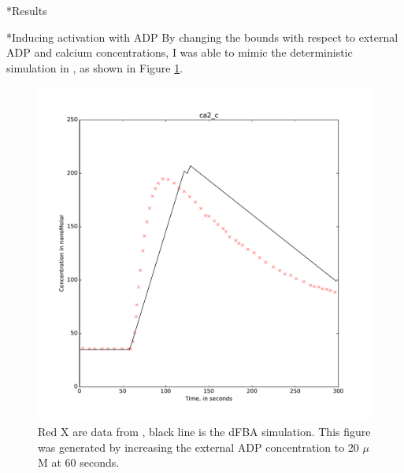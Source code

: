 \documentclass[11pt]{article}
\makeatletter
\renewcommand\subsection{\@startsection
	{subsection}{2}{0mm}
	{-0.05in}
	{-0.5\baselineskip}
	{\normalfont\normalsize\bfseries}}
\renewcommand\section{\@startsection
	{subsection}{2}{0mm}
	{-0.2in}
	{0.05\baselineskip}
	{\normalfont\large\bfseries}}
\makeatother
\begin{document}
\section*{Results}
\subsection*{Inducing activation with ADP}
By changing the bounds with respect to external ADP and calcium concentrations, I was able to mimic the deterministic simulation in \cite{purvis2008molecular}, as shown in Figure \ref{fig:ADPspike}. 
\begin{figure}
\vspace{-.5cm}
\centering
\includegraphics[scale=.35]{../figures/internalCa}
\caption{Red X are data from \cite{purvis2008molecular}, black line is the dFBA simulation. This figure was generated by increasing the external ADP concentration to 20 $\mu$M at 60 seconds.}
\label{fig:ADPspike}
\end{figure}
\end{document}
